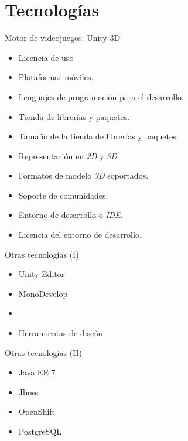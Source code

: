 \section{Tecnologías}

\begin{frame}{Motor de videojuegos: Unity 3D}

\begin{itemize}[<+->]
\item Licencia de uso
\item Plataformas móviles.
\item Lenguajes de programación para el desarrollo.
\item Tienda de librerías y paquetes.
\item Tamaño de la tienda de librerías y paquetes.
\item Representación en \textit{2D} y \textit{3D}.
\item Formatos de modelo \textit{3D} soportados.
\item Soporte de comunidades.
\item Entorno de desarrollo o \emph{IDE}.
\item Licencia del entorno de desarrollo.
\end{itemize}

\end{frame}

\begin{frame}{Otras tecnologías (I)}

\begin{itemize}[<+->]
\item Unity Editor
\item MonoDevelop
\item \cs{}
\item Herramientas de diseño
\end{itemize}

\end{frame}

\begin{frame}{Otras tecnologías (II)}

\begin{itemize}[<+->]
\item Java EE 7
\item Jboss
\item OpenShift
\item PostgreSQL
\end{itemize}

\end{frame}
